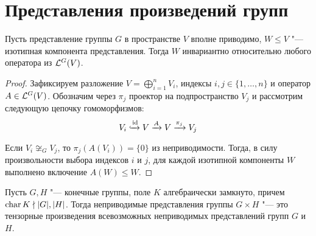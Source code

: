 \section{Представления произведений групп}

\begin{proposition}
	Пусть представление группы $G$ в пространстве $V$ вполне приводимо, $W \le V$ "--- изотипная компонента представления. Тогда $W$ инвариантно относительно любого оператора из $\mathcal L^G(V)$.
\end{proposition}

\begin{proof}
	Зафиксируем разложение $V = \bigoplus_{i=1}^n V_i$, индексы $i, j \in \{1, \dotsc, n\}$ и оператор $A \in \mathcal L^G(V)$. Обозначим через $\pi_j$ проектор на подпространство $V_j$ и рассмотрим следующую цепочку гомоморфизмов:
	\[V_i \xhookrightarrow[]{\mathrm{id}} V \xrightarrow{A} V \xrightarrow{\pi_j} V_j\]
	
	Если $V_i \not\cong_G V_j$, то $\pi_j(A(V_i)) = \{0\}$ из неприводимости. Тогда, в силу произвольности выбора индексов $i$ и $j$, для каждой изотипной компоненты $W$ выполнено включение $A(W) \le W$.
\end{proof}

\begin{theorem}
	Пусть $G, H$ "--- конечные группы, поле $K$ алгебраически замкнуто, причем $\operatorname{char}{K} \nmid |G|, |H|$. Тогда неприводимые представления группы $G \times H$ "--- это тензорные произведения всевозможных неприводимых представлений групп $G$ и $H$.
\end{theorem}

